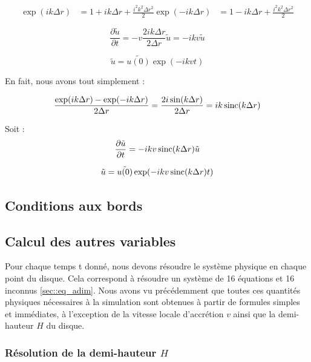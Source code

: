 \begin{align}
    \exp(ik\Delta{r}) &= 1 + ik\Delta{r} + \frac{i^2 k^2 \Delta{r}^2}{2}
    \exp(-ik\Delta{r}) &= 1 - ik\Delta{r} + \frac{i^2 k^2 \Delta{r}^2}{2}
\end{align}

\begin{equation}
    \frac{\partial \tilde{u}}{\partial t} = - v \frac{2ik\Delta{r}}{2\Delta{r}} \tilde{u} = - i k v \tilde{u}
\end{equation}

\begin{equation}
    \tilde{u} = \tilde{u(0)} \exp(-i k v t)
\end{equation}

En fait, nous avons tout simplement :

\begin{equation}
    \frac{\exp(ik\Delta{r}) - \exp(-ik\Delta{r})}{2 \Delta{r}} = \frac{2 i \sin(k\Delta{r})}{2 \Delta{r}} = i k \operatorname{sinc}(k\Delta{r})
\end{equation}

Soit :
\begin{equation}
    \frac{\partial \tilde{u}}{\partial t} = - i k v \operatorname{sinc}(k\Delta{r}) \tilde{u}
\end{equation}

\begin{equation}
    \tilde{u} = \tilde{u(0)} \exp(-i k v \operatorname{sinc}(k \Delta{r}) t)
\end{equation}

\subsection{Conditions aux bords}

\subsection{Calcul des autres variables}

Pour chaque temps t donné, nous devons résoudre le système physique en chaque point du disque. Cela correspond à résoudre un système de 16 équations et 16 inconnus \ref{sec::eq_adim}. Nous avons vu précédemment que toutes ces quantités physiques nécessaires à  la simulation sont obtenues à  partir de formules simples et immédiates, à  l'exception de la vitesse locale d'accrétion $v$ ainsi que la demi-hauteur $H$ du disque.
\subsubsection{Résolution de la demi-hauteur $H$}
\label{ssec::resolution_H}

